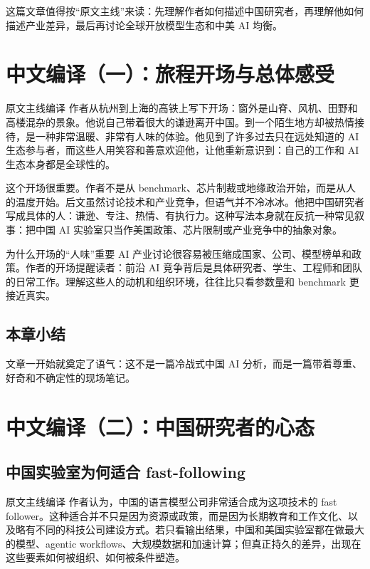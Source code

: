 \documentclass[a4paper]{article}
\begin{document}
这篇文章值得按``原文主线''来读：先理解作者如何描述中国研究者，再理解他如何描述产业差异，最后再讨论全球开放模型生态和中美 AI 均衡。


\section{中文编译（一）：旅程开场与总体感受}

\begin{translationbox}{原文主线编译}
作者从杭州到上海的高铁上写下开场：窗外是山脊、风机、田野和高楼混杂的景象。他说自己带着很大的谦逊离开中国。到一个陌生地方却被热情接待，是一种非常温暖、非常有人味的体验。他见到了许多过去只在远处知道的 AI 生态参与者，而这些人用笑容和善意欢迎他，让他重新意识到：自己的工作和 AI 生态本身都是全球性的。
\end{translationbox}

这个开场很重要。作者不是从 benchmark、芯片制裁或地缘政治开始，而是从人的温度开始。后文虽然讨论技术和产业竞争，但语气并不冷冰冰。他把中国研究者写成具体的人：谦逊、专注、热情、有执行力。这种写法本身就在反抗一种常见叙事：把中国 AI 实验室只当作美国政策、芯片限制或产业竞争中的抽象对象。

\begin{knowledgebox}{为什么开场的``人味''重要}
AI 产业讨论很容易被压缩成国家、公司、模型榜单和政策。作者的开场提醒读者：前沿 AI 竞争背后是具体研究者、学生、工程师和团队的日常工作。理解这些人的动机和组织环境，往往比只看参数量和 benchmark 更接近真实。
\end{knowledgebox}

\subsection{本章小结}

文章一开始就奠定了语气：这不是一篇冷战式中国 AI 分析，而是一篇带着尊重、好奇和不确定性的现场笔记。


\section{中文编译（二）：中国研究者的心态}

\subsection{中国实验室为何适合 fast-following}

\begin{translationbox}{原文主线编译}
作者认为，中国的语言模型公司非常适合成为这项技术的 fast follower。这种适合并不只是因为资源或政策，而是因为长期教育和工作文化、以及略有不同的科技公司建设方式。若只看输出结果，中国和美国实验室都在做最大的模型、agentic workflows、大规模数据和加速计算；但真正持久的差异，出现在这些要素如何被组织、如何被条件塑造。
\end{translationbox}
\end{document}
